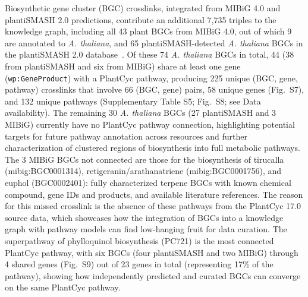 \documentclass[11pt,a4paper]{article}
\begin{document}
Biosynthetic gene cluster (BGC) crosslinks, integrated from MIBiG 4.0 and plantiSMASH 2.0 predictions,
contribute an additional 7,735 triples to the knowledge graph, including all 43 plant BGCs from MIBiG
4.0, out of which 9 are annotated to \textit{A. thaliana}, and 65 plantiSMASH-detected \textit{A.
thaliana} BGCs in the plantiSMASH 2.0 database~\cite{owen2025}. Of these 74 \textit{A. thaliana} BGCs
in total, 44 (38 from plantiSMASH and six from MIBiG) share at least one gene
(\texttt{wp:GeneProduct}) with a PlantCyc pathway, producing 225 unique (BGC, gene, pathway)
crosslinks that involve 66 (BGC, gene) pairs, 58 unique genes (Fig.~S7), and 132 unique pathways
(Supplementary Table S5; Fig.~S8; see Data availability). The remaining 30 \textit{A. thaliana} BGCs
(27 plantiSMASH and 3 MIBiG) currently have no PlantCyc pathway connection, highlighting potential
targets for future pathway annotation across resources and further characterization of clustered
regions of biosynthesis into full metabolic pathways. The 3 MIBiG BGCs not connected are those for the
biosynthesis of tirucalla (mibig:BGC0001314), retigeranin/arathanatriene (mibig:BGC0001756), and
euphol (BGC0002401): fully characterized terpene BGCs with known chemical compound, gene IDs and
products, and available literature references. The reason for this missed crosslink is the absence of
these pathways from the PlantCyc 17.0 source data, which showcases how the integration of BGCs into a
knowledge graph with pathway models can find low-hanging fruit for data curation. The superpathway of
phylloquinol biosynthesis (PC721) is the most connected PlantCyc pathway, with six BGCs (four
plantiSMASH and two MIBiG) through 4 shared genes (Fig.~S9) out of 23 genes in total (representing
17\% of the pathway), showing how independently predicted and curated BGCs can converge on the same
PlantCyc pathway.
\end{document}
